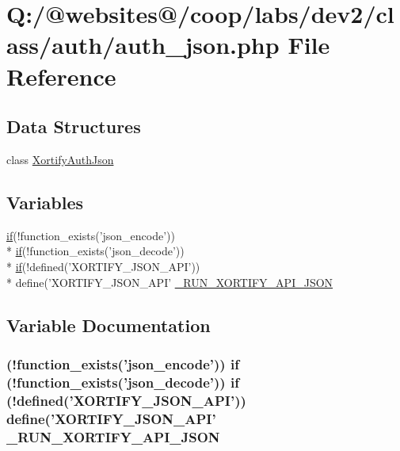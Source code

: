 \hypertarget{auth__json_8php}{\section{Q\-:/@websites@/coop/labs/dev2/class/auth/auth\-\_\-json.php File Reference}
\label{auth__json_8php}
}
\subsection*{Data Structures}
\begin{DoxyCompactItemize}
\item 
class \hyperlink{class_xortify_auth_json}{Xortify\-Auth\-Json}
\end{DoxyCompactItemize}
\subsection*{Variables}
\begin{DoxyCompactItemize}
\item 
\hyperlink{index_8php_ae2ccdf355624402b65fc2226f2a661cd}{if}(!function\-\_\-exists('json\-\_\-encode')) \\*
\hyperlink{index_8php_ae2ccdf355624402b65fc2226f2a661cd}{if}(!function\-\_\-exists('json\-\_\-decode')) \\*
\hyperlink{index_8php_ae2ccdf355624402b65fc2226f2a661cd}{if}(!defined('X\-O\-R\-T\-I\-F\-Y\-\_\-\-J\-S\-O\-N\-\_\-\-A\-P\-I')) \\*
define('X\-O\-R\-T\-I\-F\-Y\-\_\-\-J\-S\-O\-N\-\_\-\-A\-P\-I' \hyperlink{auth__json_8php_a03912c264c3f302d27b6431153308fc7}{\-\_\-\-R\-U\-N\-\_\-\-X\-O\-R\-T\-I\-F\-Y\-\_\-\-A\-P\-I\-\_\-\-J\-S\-O\-N}
\end{DoxyCompactItemize}


\subsection{Variable Documentation}
\hypertarget{auth__json_8php_a03912c264c3f302d27b6431153308fc7}{
\subsubsection[{\-\_\-\-R\-U\-N\-\_\-\-X\-O\-R\-T\-I\-F\-Y\-\_\-\-A\-P\-I\-\_\-\-J\-S\-O\-N}]{ (!function\-\_\-exists('json\-\_\-encode')) {\bf if} (!function\-\_\-exists('json\-\_\-decode')) {\bf if} (!defined('X\-O\-R\-T\-I\-F\-Y\-\_\-\-J\-S\-O\-N\-\_\-\-A\-P\-I')) define('X\-O\-R\-T\-I\-F\-Y\-\_\-\-J\-S\-O\-N\-\_\-\-A\-P\-I' \-\_\-\-R\-U\-N\-\_\-\-X\-O\-R\-T\-I\-F\-Y\-\_\-\-A\-P\-I\-\_\-\-J\-S\-O\-N}}\label{auth__json_8php_a03912c264c3f302d27b6431153308fc7}
